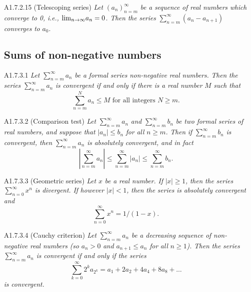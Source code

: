 \begin{lemma}{A1.7.2.15}
    (Telescoping series) \emph{Let $(a_n)_{n=m}^{\infty}$ be a sequence of real numbers
    which converge to 0, i.e., $\text{lim}_{n \rightarrow \infty}{a_n} = 0$. Then the series $\sum_{n=m}^{\infty} (a_n - a_{n+1})$
    converges to $a_0$.}
\end{lemma}

\subsection{Sums of non-negative numbers}
\begin{proposition}{A1.7.3.1}
    \emph{Let $\sum_{n=m}^{\infty} a_n$ be a formal series non-negative real numbers.
    Then the series $\sum_{n=m}^{\infty} a_n$ is convergent if and only if there
    is a real number $M$ such that
    \begin{equation*}
        \sum_{n=m}^{N} a_n \leq M \text{ for all integers $N \geq m$}.
    \end{equation*}
    }
\end{proposition}

\begin{corollary}{A1.7.3.2}
    (Comparison test) \emph{Let $\sum_{n=m}^{\infty} a_n$ and $\sum_{n=m}^{\infty} b_n$
    be two formal series of real numbers, and suppose that $|a_n| \leq b_n$
    for all $n \geq m$. Then if $\sum_{n=m}^{\infty} b_n$ is convergent, then
    $\sum_{n=m}^{\infty} a_n$ is absolutely convergent, and in fact
    \begin{equation*}
        |\sum_{n=m}^{\infty} a_n| \leq \sum_{n=m}^{\infty} |a_n| \leq \sum_{n=m}^{\infty} b_n.
    \end{equation*}
}
\end{corollary}

\begin{lemma}{A1.7.3.3}
    (Geometric series) \emph{Let $x$ be a real number. If $|x| \geq 1$, then the
    series $\sum_{n=0}^{\infty} x^n$ is divergent. If however $|x| < 1$, then
    the series is absolutely convergent and
    \begin{equation*}
        \sum_{n=0}^{\infty} x^n = 1/(1-x).
    \end{equation*}
}
\end{lemma}

\begin{proposition}{A1.7.3.4}
    (Cauchy criterion) \emph{Let $\sum_{n=m}^{\infty} a_n$ be a decreasing sequence
    of non-negative real numbers (so $a_n > 0$ and $a_{n+1} \leq a_n$ for all $n \geq 1$).
    Then the series $\sum_{n=m}^{\infty} a_n$ is convergent if and only if the
    series
    \begin{equation*}
        \sum_{k=0}^{\infty} 2^k a_{2^k} = a_1 + 2a_2 + 4a_4 + 8a_8 + \ldots
    \end{equation*}
    is convergent.}
\end{proposition}

